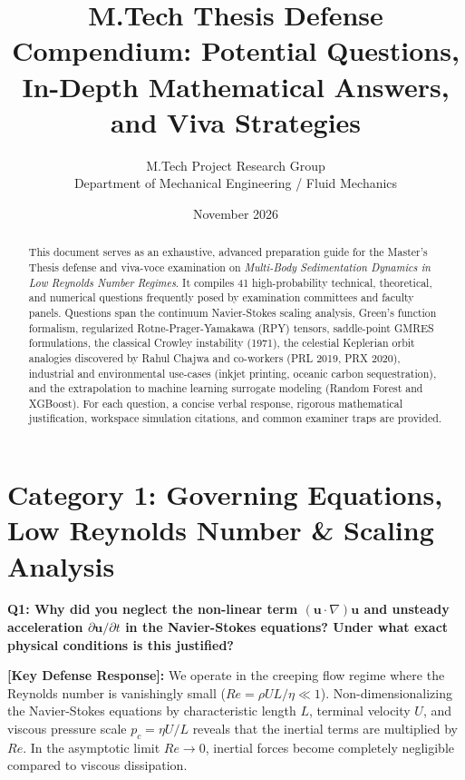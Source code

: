 \documentclass[11pt,a4paper]{article}
\title{\textbf{M.Tech Thesis Defense Compendium: Potential Questions, In-Depth Mathematical Answers, and Viva Strategies}}
\author{M.Tech Project Research Group \\ Department of Mechanical Engineering / Fluid Mechanics}
\date{November 2026}
\newcommand{\question}[2]{
    \vspace{0.4cm}
    \noindent\colorbox{blue!10}{\parbox{\dimexpr\textwidth-2\fboxsep\relax}{
        \textbf{#1: #2}
    }}
    \vspace{0.2cm}
}
\newcommand{\shortanswer}[1]{
    \noindent\textbf{\textcolor{green!50!black}{[Key Defense Response]:}} #1
    \vspace{0.2cm}
}
\begin{document}
\maketitle

\begin{abstract}
This document serves as an exhaustive, advanced preparation guide for the Master's Thesis defense and viva-voce examination on \emph{Multi-Body Sedimentation Dynamics in Low Reynolds Number Regimes}. It compiles 41 high-probability technical, theoretical, and numerical questions frequently posed by examination committees and faculty panels. Questions span the continuum Navier-Stokes scaling analysis, Green's function formalism, regularized Rotne-Prager-Yamakawa (RPY) tensors, saddle-point GMRES formulations, the classical Crowley instability (1971), the celestial Keplerian orbit analogies discovered by Rahul Chajwa and co-workers (PRL 2019, PRX 2020), industrial and environmental use-cases (inkjet printing, oceanic carbon sequestration), and the extrapolation to machine learning surrogate modeling (Random Forest and XGBoost). For each question, a concise verbal response, rigorous mathematical justification, workspace simulation citations, and common examiner traps are provided.
\end{abstract}

\tableofcontents
\newpage

\section{Category 1: Governing Equations, Low Reynolds Number \& Scaling Analysis}

\question{Q1}{Why did you neglect the non-linear term $(\mathbf{u} \cdot \nabla)\mathbf{u}$ and unsteady acceleration $\partial \mathbf{u}/\partial t$ in the Navier-Stokes equations? Under what exact physical conditions is this justified?}

\shortanswer{We operate in the creeping flow regime where the Reynolds number is vanishingly small ($Re = \rho U L / \eta \ll 1$). Non-dimensionalizing the Navier-Stokes equations by characteristic length $L$, terminal velocity $U$, and viscous pressure scale $p_c = \eta U / L$ reveals that the inertial terms are multiplied by $Re$. In the asymptotic limit $Re \to 0$, inertial forces become completely negligible compared to viscous dissipation.}
\end{document}
